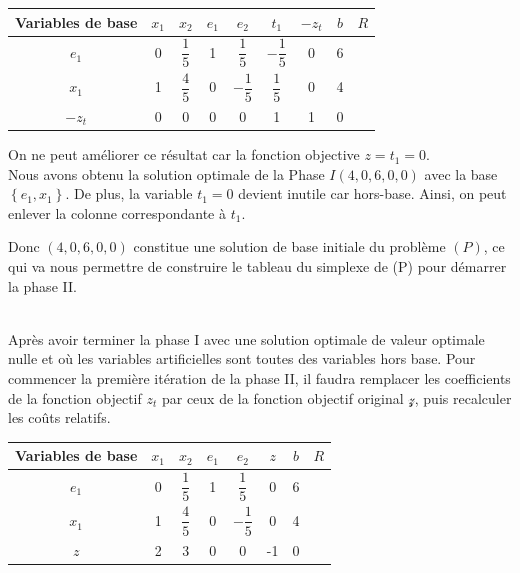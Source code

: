\documentclass[a4paper,12pt,openany]{book}
\theoremstyle{plain}
\theoremstyle{definition}
\theoremstyle{remark}
\theoremstyle{nbstyle}
\begin{document}
\begin{description}
		\begin{center}
			\begin{tabular}{|c|cccccc|c|c|}
				\hline
				Variables de base & $x_{1}$ & $x_{2}$ & $e_{1}$ & $e_{2}$ & $t_{1}$ & $-z_{t}$ & $b$ & $R$ \\
				\hline
				$e_{1}$ & 0 & $\dfrac{1}{5}$ & 1 & $\dfrac{1}{5}$ & $-\dfrac{1}{5}$ & 0 & 6 &  \\
				$x_{1}$ & 1 & $\dfrac{4}{5}$ & 0 & $-\dfrac{1}{5}$ & $\dfrac{1}{5}$ & 0 & 4 &  \\
				\hline
				$-z_{t}$ & 0 & 0 & 0 & 0 & 1 & 1 & 0 &  \\
				\hline
			\end{tabular}
		\end{center}
		
		On ne peut améliorer ce résultat car la fonction objective $z=t_{1}=0$.\\
		Nous avons obtenu la solution optimale de la Phase $I(4,0,6,0,0)$ avec la base $\left\{e_{1}, x_{1}\right\}$. De plus, la variable $t_{1}=0$ devient inutile car hors-base. Ainsi, on peut enlever la colonne correspondante à $t_{1}$.
		
		Donc $(4,0,6,0,0)$ constitue une solution de base initiale du problème $(P)$, ce qui va nous permettre de construire le tableau du simplexe de (P) pour démarrer la phase II.
		
		\item[Phase II]\quad\\
		Après avoir terminer la phase I avec une solution optimale de valeur optimale nulle et où les variables artificielles sont toutes des variables hors base. Pour commencer la première itération de la phase II, il faudra remplacer les coefficients de la fonction objectif $z_{t}$ par ceux de la fonction objectif original $\mathcal{z}$, puis recalculer les coûts relatifs.
		
		\begin{center}
			\begin{tabular}{|c|ccccc|c|c|}
				\hline
				Variables de base & $x_{1}$ & $x_{2}$ & $e_{1}$ & $e_{2}$ & $z$ & $b$ & $R$ \\
				\hline
				$e_{1}$ & 0 & $\dfrac{1}{5}$ & 1 & $\dfrac{1}{5}$ & 0 & 6 &  \\
				$x_{1}$ & 1 & $\dfrac{4}{5}$ & 0 & $-\dfrac{1}{5}$ & 0 & 4 &  \\
				\hline
				$z$ & 2 & 3 & 0 & 0 & -1 & 0 &  \\
				\hline
			\end{tabular}
		\end{center}
		

\end{description}
\end{document}
